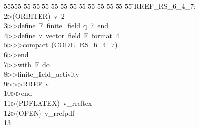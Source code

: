 %
%
\begin{tabbing}
55555 \= 55 \= 55 \= 55 \= 55 \= 55 \= 55 \= 55 \= 55 \= 55 \= 55 \= 55 \= 55 \= \>RREF\_RS\_6\_4\_7:\\[0pt]
2\>$\triangleright$\>(ORBITER)\ v\ 2\ \\[0pt]
3\>$\triangleright$\>$\triangleright$\>define\ F\ finite\_field\ q\ 7\ end\ \\[0pt]
4\>$\triangleright$\>$\triangleright$\>define\ v\ vector\ field\ F\ format\ 4\ \\[0pt]
5\>$\triangleright$\>$\triangleright$\>$\triangleright$\>compact\ (CODE\_RS\_6\_4\_7)\ \\[0pt]
6\>$\triangleright$\>$\triangleright$\>end\ \\[0pt]
7\>$\triangleright$\>$\triangleright$\>with\ F\ do\ \\[0pt]
8\>$\triangleright$\>$\triangleright$\>finite\_field\_activity\ \\[0pt]
9\>$\triangleright$\>$\triangleright$\>$\triangleright$\>RREF\ v\ \\[0pt]
10\>$\triangleright$\>$\triangleright$\>end\\[0pt]
11\>$\triangleright$\>(PDFLATEX)\ v\_rreftex\\[0pt]
12\>$\triangleright$\>(OPEN)\ v\_rrefpdf\\[0pt]
13\>\end{tabbing}
